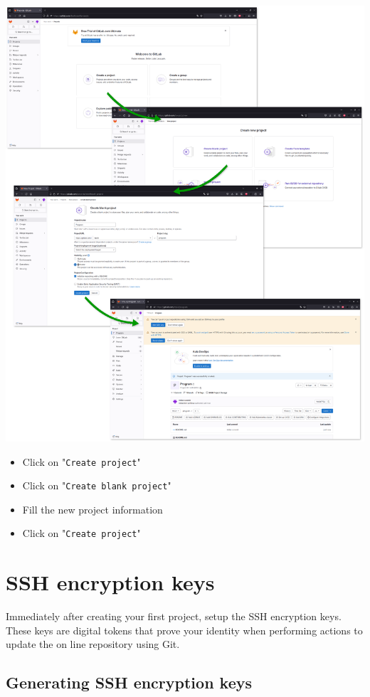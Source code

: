 \includegraphics[width=1.0\textwidth,keepaspectratio=true,draft=\ddst]{img/hosts/gitlab/new-p.eps} %
\newpage
\begin{itemize}
\item Click on "\texttt{Create project}"
\item Click on "\texttt{Create blank project}"
\item Fill the new project information
\item Click on "\texttt{Create project}"
\end{itemize}

\section{SSH encryption keys}

Immediately after creating your first project, setup the SSH encryption keys. 
These keys are digital tokens that prove your identity when performing actions to update the on line repository using Git. 

\subsection{Generating SSH encryption keys}

